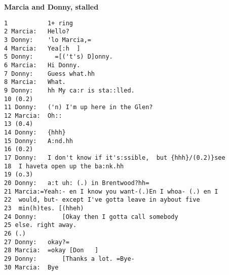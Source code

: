 \textbf{Marcia and Donny, stalled} %
\begin{lstlisting}
1           1+ ring
2 Marcia:   Hello?
3 Donny:    'lo Marcia,=
4 Marcia:   Yea[:h  ]
5 Donny:      =[('t's) D]onny.
6 Marcia:   Hi Donny.
7 Donny:    Guess what.hh
8 Marcia:   What.
9 Donny:    hh My ca:r is sta::lled.
10 (0.2)
11 Donny:   ('n) I'm up here in the Glen?
12 Marcia:  Oh::
13 (0.4)
14 Donny:   {hhh}
15 Donny:   A:nd.hh
16 (0.2)
17 Donny:   I don't know if it's:ssible,  but {hhh}/(0.2)}see
18  I haveta open up the ba:nk.hh
19 (o.3)
20 Donny:   a:t uh: (.) in Brentwood?hh=
21 Marcia:=Yeah:- en I know you want-(.)En I whoa- (.) en I
22  would, but- except I've gotta leave in aybout five
23  min(h)tes. [(hheh)
24 Donny:       [Okay then I gotta call somebody
25 else. right away.
26 (.)
27 Donny:   okay?=
28 Marcia:  =okay [Don   ]
29 Donny:       [Thanks a lot. =Bye-
30 Marcia:  Bye
\end{lstlisting}